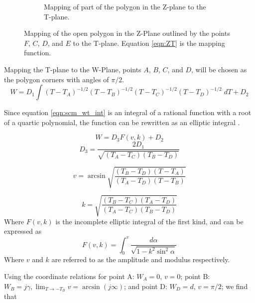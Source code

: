 \begin{figure}[h]
\begin{subfigure}[t]{0.45\textwidth}
        \caption{Mapping of part of the polygon in the Z-plane to the T-plane.}
    \end{subfigure} 
    \caption[Mapping of the open polygon in the Z-Plane to the T-plane.]{Mapping of the open polygon in the Z-Plane outlined by the points $F$, $C$, $D$, and $E$ to the T-plane. Equation \ref{eqn:ZT} is the mapping function.} 
    \label{fig:Z_to_T_mapping}
 \end{figure}

 \par Mapping the T-plane to the W-Plane, points $A$, $B$, $C$, and $D$, will be chosen as the polygon corners with angles of $\pi/2$.
 \begin{equation}
    W = D_1 \int (T-T_A)^{-1/2}(T-T_B)^{-1/2}(T-T_C)^{-1/2}(T-T_D)^{-1/2}\;dT + D_2
    \label{eqn:scm_wt_int}
 \end{equation}
 
 \noindent Since equation \ref{eqn:scm_wt_int} is an integral of a rational function with a root of a quartic polynomial, the function can be rewritten as an elliptic integral \cite{i.s._gradshteyn_table_1980}.
 
 \begin{equation}
     W = D_3F(v,k) + D_2
 \end{equation}
 \begin{equation}
    D_3 = \frac{2D_1}{\sqrt{(T_A - T_C)(T_B-T_D)}}
 \end{equation}
 
 \begin{equation}
     v = \arcsin\sqrt{\frac{(T_B-T_D)(T-T_A)}{(T_A-T_D)(T-T_B)}}
 \end{equation}
 
 \begin{equation}
     k = \sqrt{\frac{(T_B-T_C)(T_A-T_D)}{(T_A-T_C)(T_B-T_D)}}
 \end{equation}
 \noindent Where $F(v,k)$ is the incomplete elliptic integral of the first kind, and can be expressed as
 \begin{equation}
     F(v,k) = \int^v_0 \frac{d\alpha}{\sqrt{1 - k^2\sin^2\alpha}}
 \end{equation}
 \noindent Where $v$ and $k$ are referred to as the amplitude and modulus respectively.
 
 \par Using the coordinate relations for point A: $W_A = 0$, $v = 0$; point B: $W_B = j\gamma, \lim_{T\to-T_B}v = \arcsin(j\infty)$; and point D: $W_D = d$, $v = \pi/2$; we find that 
 
